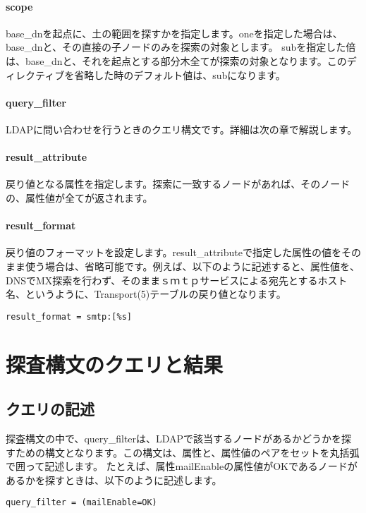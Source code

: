 \paragraph{scope}
base\_dnを起点に、土の範囲を探すかを指定します。oneを指定した場合は、base\_dnと、その直接の子ノードのみを探索の対象とします。
subを指定した倍は、base\_dnと、それを起点とする部分木全てが探索の対象となります。このディレクティブを省略した時のデフォルト値は、subになります。

\paragraph{query\_filter}
LDAPに問い合わせを行うときのクエリ構文です。詳細は次の章で解説します。

\paragraph{result\_attribute}
戻り値となる属性を指定します。探索に一致するノードがあれば、そのノードの、属性値が全てが返されます。

\paragraph{result\_format}
戻り値のフォーマットを設定します。result\_attributeで指定した属性の値をそのまま使う場合は、省略可能です。例えば、以下のように記述すると、属性値を、DNSでMX探索を行わず、そのままｓｍｔｐサービスによる宛先とするホスト名、というように、Transport(5)テーブルの戻り値となります。

\begin{verbatim}
result_format = smtp:[%s]
\end{verbatim}

\section{探査構文のクエリと結果}


\subsection{クエリの記述}

探査構文の中で、query\_filterは、LDAPで該当するノードがあるかどうかを探すための構文となります。この構文は、属性と、属性値のペアをセットを丸括弧で囲って記述します。
たとえば、属性mailEnableの属性値がOKであるノードがあるかを探すときは、以下のように記述します。

\begin{verbatim}
query_filter = (mailEnable=OK)
\end{verbatim}

